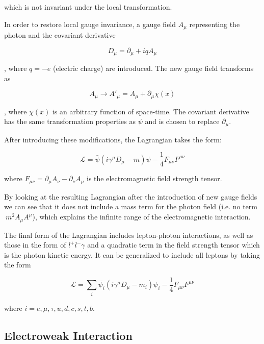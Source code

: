 which is not invariant under the local transformation.

In order to restore local gauge invariance, a gauge field $A_{\mu}$ representing the photon and the covariant derivative 

\begin{equation}
D_{\mu} = \partial_{\mu} + iq A_{\mu}
\end{equation} 

, where $q = -e$ (electric charge) are introduced. The new gauge field transforms as

\begin{equation}
A_{\mu}\rightarrow A'_{\mu} = A_{\mu} + \partial_{\mu}\chi(x)
\end{equation}

, where $\chi(x)$ is an arbitrary function of space-time. The covariant derivative has the same transformation properties as $\psi$ and is chosen to replace $\partial_{\mu}$.

After introducing these modifications, the Lagrangian takes the form:

\begin{equation}
\mathcal{L} = \bar{\psi}(i\gamma^{\mu}D_{\mu}-m)\psi - \frac{1}{4}F_{\mu\nu}F^{\mu\nu}
\end{equation}

where $F_{\mu\nu}= \partial_{\mu}A_{\nu} - \partial_{\nu}A_{\mu}$ is the electromagnetic field strength tensor. 

By looking at the resulting Lagrangian after the introduction of new gauge fields we can see that it does not include a mass term for the photon field (i.e. no term $~m^{2}A_{\mu}A^{\mu}$), which explains the infinite range of the electromagnetic interaction. 

The final form of the Lagrangian includes lepton-photon interactions, as well as those in the form of $l^{+}l^{-}\gamma$ and a quadratic term in the field strength tensor which is the photon kinetic energy. It can be generalized to include all leptons by taking the form

\begin{equation}
\mathcal{L} = \sum_{i}\bar{\psi_{i}}(i\gamma^{\mu}D_{\mu}-m_{i})\psi_{i} - \frac{1}{4}F_{\mu\nu}F^{\mu\nu}
\end{equation}

where $i=e,\mu,\tau,u,d,c,s,t,b$.

\subsection{Electroweak Interaction}

